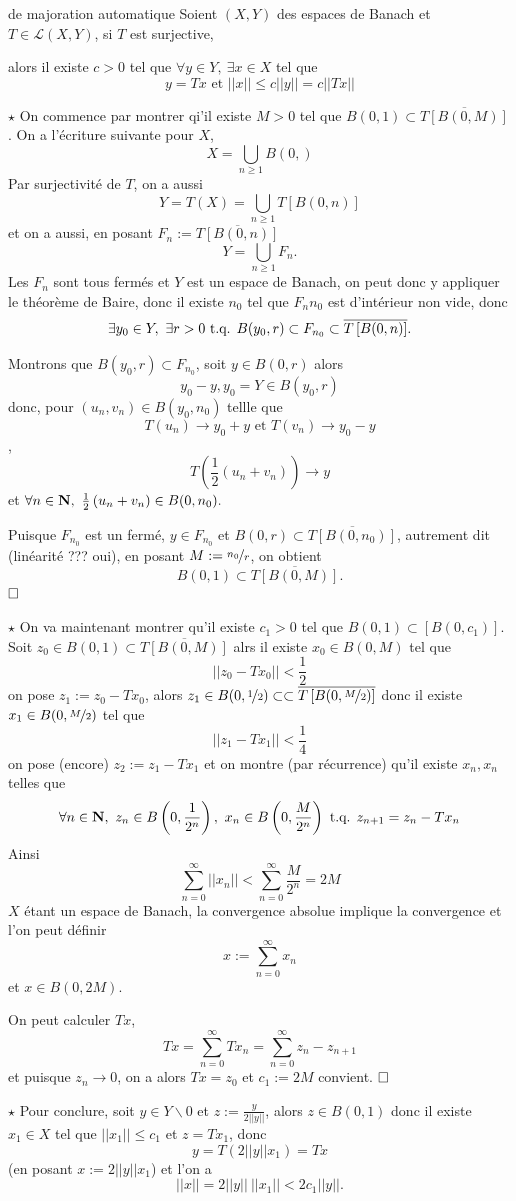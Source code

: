 \documentclass[a4paper,11pt, twoside]{article}
\begin{document}
\begin{thC}{de majoration automatique}
  Soient $(X,Y)$ des espaces de Banach et $T\in\mathcal L(X,Y)$, si $T$ est surjective,

  alors il existe $c>0$ tel que $\forall y\in Y,\ \exists x\in X$ tel que
  $$y=Tx\text{ et }||x||\leqslant c||y||=c||Tx||$$
\end{thC}


\begin{Proof}
  $\star$ On commence par montrer qi'il existe $M>0$ tel que $B(0,1)\subset \overline{T\left[B(0,M)\right]}$. On a l'écriture suivante pour $X$,
  $$X=\bigcup_{n\geqslant 1}B(0,)$$
  Par surjectivité de $T$, on a aussi
  $$Y=T(X)=\bigcup_{n\geqslant 1}T\left[B(0,n)\right]$$
  et on a aussi, en posant $F_n:=\overline{T\left[B(0,n)\right]}$
  $$Y=\bigcup_{n\geqslant 1}F_n.$$
  Les $F_n$ sont tous fermés et $Y$ est un espace de Banach, on peut donc y appliquer le théorème de Baire, donc il existe $n_0$ tel que $F_n{n_0}$ est d'intérieur non vide, donc
  $$\exists y_0\in Y,\ \exists r>0\text{ t.q. } B(y_0,r)\subset F_{n_0}\subset \overline{T\left[B(0,n)\right]}.$$

  Montrons que $B(y_0,r)\subset F_{n_0}$, soit $y\in B(0,r)$ alors 
  $$y_0-y,y_0=Y\in B(y_0,r)$$
  donc, pour $(u_n,v_n)\in B(y_0,n_0)$ tellle que 
  $$T(u_n)\longrightarrow y_0+y\text{ et }T(v_n)\longrightarrow y_0-y$$,
  $$T\left(\frac12\left(u_n+v_n\right)\right)\longrightarrow y$$
  et $\forall n\in\N,\ \frac12\left(u_n+v_n\right)\in B(0,n_0).$

  Puisque $F_{n_0}$ est un fermé, $y\in F_{n_0}$ et $B(0,r)\subset\overline{T\left[B(0,n_0)\right]}$, autrement dit (linéarité ??? oui), en posant $M:=\nicefrac{n_0}{r}$, on obtient 
  $$B(0,1)\subset \overline{T\left[B(0,M)\right]}.$$
  $\hfill\square$ 

  $\star$ On va maintenant montrer qu'il existe $c_1>0$ tel que $B(0,1)\subset\left[B(0,c_1)\right].$ Soit $z_0\in B(0,1)\subset \overline{T\left[B(0,M)\right]}$ alrs il existe $x_0\in B(0,M)$ tel que
  $$||z_0-Tx_0||<\frac12$$
  on pose $z_1:=z_0-Tx_0$, alors $z_1\in B(0,\nicefrac12)\subset \subset \overline{T\left[B(0,\nicefrac{M}{2})\right]}$ donc il existe $x_1\in B(0,\nicefrac{M}{2})$ tel que 
  $$||z_1-Tx_1||<\frac14$$
  on pose (encore) $z_2:=z_1-Tx_1$ et on montre (par récurrence) qu'il existe $x_n,x_n$ telles que 
  $$\forall n\in \mathbf N,\ z_n\in B\left(0,\frac{1}{2^n}\right),\ x_n\in B\left(0,\frac{M}{2^n}\right)\text{ t.q. } z_{n+1}=z_n-Tx_n$$
  Ainsi 
  $$\sum_{n=0}^\infty ||x_n||<\sum_{n=0}^\infty\frac{M}{2^n}=2M$$
  $X$ étant un espace de Banach, la convergence absolue implique la convergence et l'on peut définir 
  $$x:=\sum_{n=0}^\infty x_n$$
  et $x\in B(0,2M)$.

  On peut calculer $Tx$,
  $$Tx=\sum_{n=0}^\infty Tx_n=\sum_{n=0}^\infty z_n-z_{n+1}$$
  et puisque $z_n\longrightarrow 0$, on a alors $Tx=z_0$ et $c_1:=2M$ convient.
  $\hfill\square$

  $\star$ Pour conclure, soit $y\in Y\backslash {0}$ et $z:=\frac{y}{2||y||}$, alors $z\in B(0,1)$ donc il existe $x_1\in X$ tel que $||x_1||\leqslant c_1$ et $z=Tx_1$, donc
  $$y=T(2||y||x_1)=Tx$$
  (en posant $x:=2||y||x_1$) et l'on a 
  $$||x||=2||y||\ ||x_1||<2c_1||y||.$$
\end{Proof}
\end{document}

